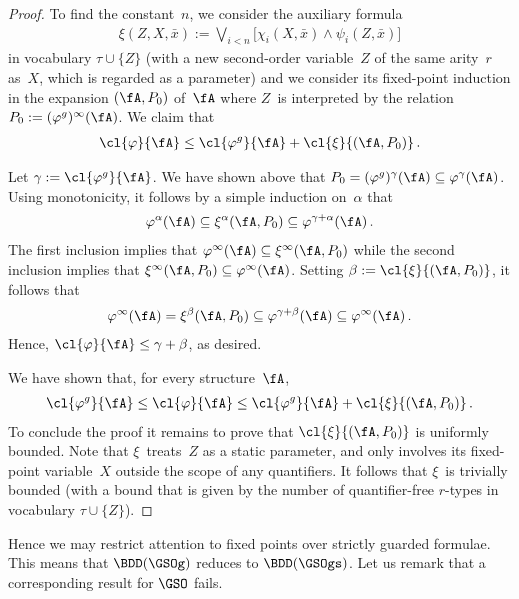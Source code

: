 \documentclass{LMCS}
\begin{document}
\begin{proof}
To find the constant~$n$, we consider the auxiliary formula
\begin{align*}
  \xi(Z,X,\bar x) :=
    \bigvee_{i<n} \bigl[\chi_i(X,\bar x) \wedge \psi_i(Z,\bar x)\bigr]
\end{align*}
in vocabulary $\tau \cup \{ Z \}$
(with a new second-order variable~$Z$ of the same arity~$r$ as~$X$,
which is regarded as a parameter) and
we consider its fixed-point induction in the expansion
$(\fA,P_0)$ of~$\fA$ where $Z$~is interpreted by the relation $P_0 := (\varphi^g)^\infty(\fA)$.
We claim that
\begin{align*}
  \cl{\varphi}{\fA} \leq \cl{\varphi^g}{\fA} + \cl{\xi}{(\fA,P_0)}\,.
\end{align*}

Let $\gamma := \cl{\varphi^g}{\fA}$. We have shown above that
$P_0 = (\varphi^g)^\gamma(\fA) \subseteq \varphi^\gamma(\fA)$.
Using monotonicity, it follows by a simple induction on~$\alpha$ that
\begin{align*}
  \varphi^\alpha(\fA) \subseteq \xi^\alpha(\fA,P_0) \subseteq \varphi^{\gamma+\alpha}(\fA)\,.
\end{align*}
The first inclusion implies that $\varphi^\infty(\fA) \subseteq \xi^\infty(\fA,P_0)$ while
the second inclusion implies that $\xi^\infty(\fA,P_0) \subseteq \varphi^\infty(\fA)$.
Setting $\beta := \cl{\xi}{(\fA,P_0)}$, it follows that
\begin{align*}
  \varphi^\infty(\fA) = \xi^\beta(\fA,P_0) \subseteq \varphi^{\gamma+\beta}(\fA) \subseteq \varphi^\infty(\fA)\,.
\end{align*}
Hence, $\cl{\varphi}{\fA} \leq \gamma + \beta$, as desired.

We have shown that, for every structure~$\fA$,
\begin{align*}
  \cl{\varphi^g}{\fA} \leq \cl{\varphi}{\fA} \leq \cl{\varphi^g}{\fA} + \cl{\xi}{(\fA,P_0)}\,.
\end{align*}
To conclude the proof it remains to prove that $\cl{\xi}{(\fA,P_0)}$ is uniformly bounded.
Note that $\xi$~treats~$Z$ as a static parameter, and only involves
its fixed-point variable~$X$ outside the scope of any quantifiers.
It follows that $\xi$~is trivially bounded (with a bound that is given by
the number of quantifier-free $r$-types in vocabulary $\tau \cup \{ Z \}$).
\end{proof}

Hence we may restrict attention
to fixed points over strictly guarded formulae.
This means that $\BDD(\GSOg)$ reduces to $\BDD(\GSOgs)$.
Let us remark that a corresponding result for $\GSO$ fails.
\end{document}
